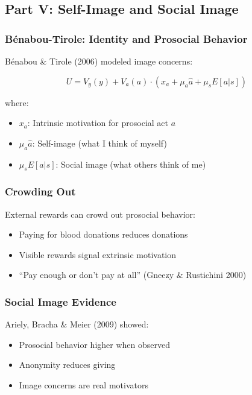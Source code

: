 \subsection{Part V: Self-Image and Social Image}

\subsubsection{Bénabou-Tirole: Identity and Prosocial Behavior}

Bénabou \& Tirole (2006) modeled image concerns:

\begin{equation}
\boxed{
U = V_y(y) + V_a(a) \cdot (x_a + \mu_a \hat{a} + \mu_s E[a|s])
}
\label{eq:benabou-tirole}
\end{equation}

where:
\begin{itemize}
    \item $x_a$: Intrinsic motivation for prosocial act $a$
    \item $\mu_a \hat{a}$: Self-image (what I think of myself)
    \item $\mu_s E[a|s]$: Social image (what others think of me)
\end{itemize}

\subsubsection{Crowding Out}

External rewards can crowd out prosocial behavior:
\begin{itemize}
    \item Paying for blood donations reduces donations
    \item Visible rewards signal extrinsic motivation
    \item ``Pay enough or don't pay at all'' (Gneezy \& Rustichini 2000)
\end{itemize}

\subsubsection{Social Image Evidence}

Ariely, Bracha \& Meier (2009) showed:
\begin{itemize}
    \item Prosocial behavior higher when observed
    \item Anonymity reduces giving
    \item Image concerns are real motivators
\end{itemize}

